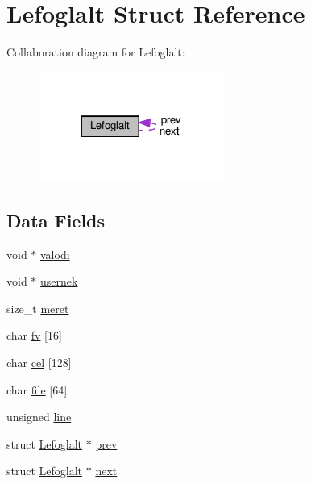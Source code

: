 \hypertarget{struct_lefoglalt}{}\section{Lefoglalt Struct Reference}
\label{struct_lefoglalt}


Collaboration diagram for Lefoglalt\+:\nopagebreak
\begin{figure}[H]
\begin{center}
\leavevmode
\includegraphics[width=173pt]{struct_lefoglalt__coll__graph}
\end{center}
\end{figure}
\subsection*{Data Fields}
\begin{DoxyCompactItemize}
\item 
void $\ast$ \hyperlink{struct_lefoglalt_a59522ad17870bd526fae5bbbc8125966}{valodi}
\item 
void $\ast$ \hyperlink{struct_lefoglalt_a58c09d4017310a90fad327e926330b96}{usernek}
\item 
size\+\_\+t \hyperlink{struct_lefoglalt_a7054394a4199245d774ead13d3bed5d6}{meret}
\item 
char \hyperlink{struct_lefoglalt_abfdd6d3e984090f35c264b15cf69c81a}{fv} \mbox{[}16\mbox{]}
\item 
char \hyperlink{struct_lefoglalt_aa8cbe4c2c142597b17ff65623129109f}{cel} \mbox{[}128\mbox{]}
\item 
char \hyperlink{struct_lefoglalt_a353d29f9f9cc0db6fca9d49b5f88d34d}{file} \mbox{[}64\mbox{]}
\item 
unsigned \hyperlink{struct_lefoglalt_a05ef0c4dbeec4fc8ccb225de9c26d896}{line}
\item 
struct \hyperlink{struct_lefoglalt}{Lefoglalt} $\ast$ \hyperlink{struct_lefoglalt_a2b1e290e1bec4c24cb7ec2aaf8747687}{prev}
\item 
struct \hyperlink{struct_lefoglalt}{Lefoglalt} $\ast$ \hyperlink{struct_lefoglalt_adc30abdfb5e692e2c216e3673d0d19b9}{next}
\end{DoxyCompactItemize}


